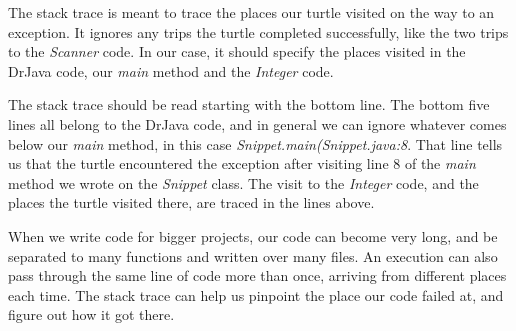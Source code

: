
The stack trace is meant to trace the places our turtle visited on the way to an exception. It ignores any trips the turtle completed successfully, like the two trips to the \emph{Scanner} code. In our case, it should specify the places visited in the DrJava code, our \emph{main} method and the \emph{Integer} code.

The stack trace should be read starting with the bottom line. The bottom five lines all belong to the DrJava code, and in general we can ignore whatever comes below our \emph{main} method, in this case \emph{Snippet.main(Snippet.java:8}. That line tells us that the turtle encountered the exception after visiting line 8 of the \emph{main} method we wrote on the \emph{Snippet} class. The visit to the \emph{Integer} code, and the places the turtle visited there, are traced in the lines above. 

When we write code for bigger projects, our code can become very long, and be separated to many functions and written over many files. An execution can also pass through the same line of code more than once, arriving from different places each time. The stack trace can help us pinpoint the place our code failed at, and figure out how it got there.

      





